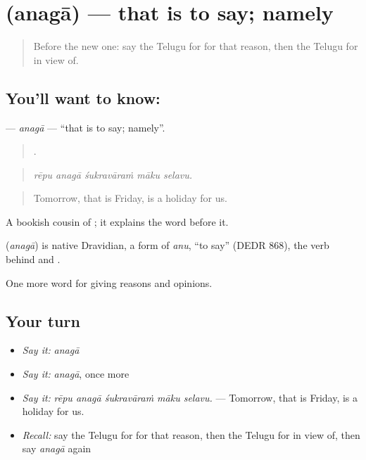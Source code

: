 \section[\texorpdfstring{\te{అనగా} (anagā)}{అనగా (anagā)}]{ (anagā) — that is to say; namely}

\label{lesson:TE-C395-anaga}



\begin{quote}
Before the new one: say the Telugu for for that reason, then the Telugu for in view of.
\end{quote}

\subsection*{You'll want to know: }
\textbf{} — \emph{anagā} — \textquotedblleft{}that is to say; namely\textquotedblright{}.

\begin{quote}
    .
\end{quote}

\begin{quote}
\emph{rēpu anagā śukravāraṁ māku selavu.}
\end{quote}

\begin{quote}
Tomorrow, that is Friday, is a holiday for us.
\end{quote}

A bookish cousin of ; it explains the word before it.

\begin{cousinweb}
\textbf{} (\emph{anagā}) is native Dravidian, a form of \emph{anu}, \textquotedblleft{}to say\textquotedblright{} (DEDR 868), the verb behind  and .
\end{cousinweb}

\begin{grammarlens}[title={What you've built}]
One more word for giving reasons and opinions.
\end{grammarlens}

\subsection*{Your turn}
\begin{itemize}
\raggedright
  \item \emph{Say it:} \emph{anagā}
  \item \emph{Say it:} \emph{anagā}, once more
  \item \emph{Say it:} \emph{rēpu anagā śukravāraṁ māku selavu.} — Tomorrow, that is Friday, is a holiday for us.
  \item \emph{Recall:} say the Telugu for for that reason, then the Telugu for in view of, then say \emph{anagā} again
\end{itemize}

